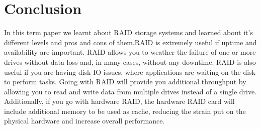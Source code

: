 \documentclass{article}
\begin{document}
\section{Conclusion}
In this term paper we learnt about RAID storage systems and learned about it's different levels and pros and cons of them.RAID is extremely useful if uptime and availability are important. RAID allows you to weather the failure of one or more drives without data loss and, in many cases, without any downtime. RAID is also useful if you are having disk IO issues, where applications are waiting on the disk to perform tasks. Going with RAID will provide you additional throughput by allowing you to read and write data from multiple drives instead of a single drive. Additionally, if you go with hardware RAID, the hardware RAID card will include additional memory to be used as cache, reducing the strain put on the physical hardware and increase overall performance. 
\end{document}
